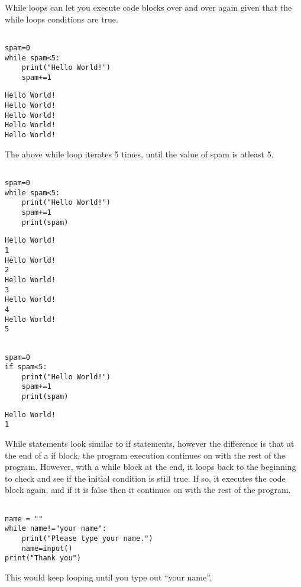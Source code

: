 \documentclass[11pt]{article}
\begin{document}
While loops can let you execute code blocks over and over again given that the while loops conditions are true.


\begin{verbatim}

spam=0
while spam<5:
    print("Hello World!")
    spam+=1

\end{verbatim}

\begin{verbatim}
Hello World!
Hello World!
Hello World!
Hello World!
Hello World!
\end{verbatim}


The above while loop iterates 5 times, until the value of spam is atleast 5.

\begin{verbatim}

spam=0
while spam<5:
    print("Hello World!")
    spam+=1
    print(spam)

\end{verbatim}

\begin{verbatim}
Hello World!
1
Hello World!
2
Hello World!
3
Hello World!
4
Hello World!
5
\end{verbatim}


\begin{verbatim}

spam=0
if spam<5:
    print("Hello World!")
    spam+=1
    print(spam)

\end{verbatim}

\begin{verbatim}
Hello World!
1
\end{verbatim}


While statements look similar to if statements, however the difference is that at the end of a if block, the program execution continues on with the rest of the program. However, with a while block at the end, it loops back to the beginning to check and see if the initial condition is still true. If so, it executes the code block again, and if it is false then it continues on with the rest of the program.


\begin{verbatim}

name = ""
while name!="your name":
    print("Please type your name.")
    name=input()
print("Thank you")

\end{verbatim}

This would keep looping until you type out ``your name''.
\end{document}
